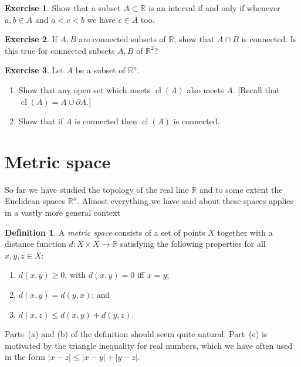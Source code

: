 \documentclass[11pt,oneside]{amsbook}
\newcommand{\R}{\mathbb R}
\DeclareMathOperator{\cl}{cl}
\theoremstyle{definition}
\newtheorem{exerc}{Exercise}[section]
\theoremstyle{plain}
\theoremstyle{definition}
\newtheorem{defn}[thm]{Definition}
\theoremstyle{remark}
\numberwithin{equation}{section}
\numberwithin{figure}{section}
\begin{document}
\begin{exerc}
  Show that a subset $A\subset\R$ is an interval if and only if whenever $a,b\in A$ and $a<c<b$ we have $c\in A$ too.
\end{exerc}


\begin{exerc}
  If $A,B$ are connected subsets of $\R$, show that $A\cap B$ is connected. Is this true for connected subsets $A,B$ of $\R^2$?
\end{exerc}

\begin{exerc}
  Let $A$ be a subset of $\R^n$.
  \begin{enumerate}
    \item Show that any open set which meets $\cl(A)$ also meets $A$. [Recall that $\cl(A)=A\cup\partial A$.]
    \item Show that if $A$ is connected then $\cl(A)$ is connected.
  \end{enumerate}
\end{exerc}

\newpage
\section{Metric space}

So far we have studied the topology of the real line $\R$ and to some extent the Euclidean spaces $\R^n$. Almost everything we have said about these spaces applies in a vastly more general context

\begin{defn}
  A \emph{metric space} consists of a set of points $X$ together with a distance function $d\colon X\times X\to\R$ satisfying the following properties for all $x,y,z\in X$:
  \begin{enumerate}
  \item $d(x,y)\geq0$, with $d(x,y)=0$ iff $x=y$;
  \item $d(x,y)=d(y,x)$; and
  \item $d(x,z)\leq d(x,y)+d(y,z)$.
  \end{enumerate}
\end{defn}

Parts~(a) and (b) of the definition should seem quite natural. Part~(c) is motivated by the triangle inequality for real numbers, which we have often used in the form $|x-z|\leq|x-y|+|y-z|$.
\end{document}

